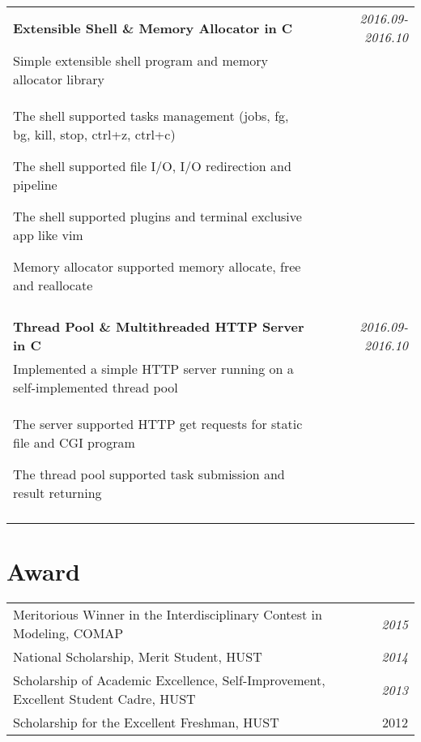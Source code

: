 \documentclass[a4paper,10pt]{article}
\begin{document}
\begin{tabular}{p{13.5cm}p{0.5cm}r}
\textbf{Extensible Shell \& Memory Allocator in C} && \emph{2016.09-2016.10} \\
\hspace{1em} Simple extensible shell program and memory allocator library && \vspace{-0.5em} \\
\begin{compactitem}
  \item The shell supported tasks management (jobs, fg, bg, kill, stop, ctrl+z, ctrl+c) \vspace{0.2em}
  \item The shell supported file I/O, I/O redirection and pipeline \vspace{0.2em}
  \item The shell supported plugins and terminal exclusive app like vim \vspace{0.2em}  
  \item Memory allocator supported memory allocate, free and reallocate \vspace{0.2em}
\end{compactitem}&&\vspace{-2.2em} \\
\multicolumn{3}{c}{} \\


\textbf{Thread Pool \& Multithreaded HTTP Server in C} && \emph{2016.09-2016.10} \\
\hspace{1em} Implemented a simple HTTP server running on a self-implemented thread pool && \vspace{-0.5em} \\
\begin{compactitem}
  \item The server supported HTTP get requests for static file and CGI program\vspace{0.2em}
  \item The thread pool supported task submission and result returning\vspace{0.2em}
\end{compactitem}&&\vspace{-2.2em} \\
\multicolumn{3}{c}{} \\

\end{tabular}


\section{Award}
\begin{tabular}{p{14cm}p{1.5cm}r}
Meritorious Winner in the Interdisciplinary Contest in Modeling, COMAP  && \emph{2015} \\
National Scholarship, Merit Student, HUST && \emph{2014} \\
Scholarship of Academic Excellence, Self-Improvement, Excellent Student Cadre, HUST && \emph{2013} \\
Scholarship for the Excellent Freshman, HUST && 2012\\
\end{tabular}
\end{document}
